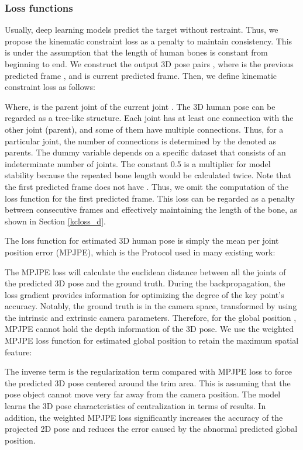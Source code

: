 \documentclass[runningheads]{llncs}
\begin{document}
\subsubsection{Loss functions} Usually, deep learning models predict the target without restraint. Thus, we propose the kinematic constraint loss as a penalty to maintain consistency. This is under the assumption that the length of human bones is constant from beginning to end. We construct the output 3D pose pairs , where  is the previous predicted frame , and  is current predicted frame. Then, we define kinematic constraint loss as follows:

Where,  is the parent joint of the current joint . The 3D human pose can be regarded as a tree-like structure. Each joint has at least one connection with the other joint (parent), and some of them have multiple connections. Thus, for a particular joint, the number of connections is determined by the  denoted as parents. The dummy variable  depends on a specific dataset that consists of an indeterminate number of joints. The constant 0.5 is a multiplier for model stability because the repeated bone length would be calculated twice. Note that the first predicted frame does not have . Thus, we omit the computation of the loss function for the first predicted frame. This loss can be regarded as a penalty between consecutive frames and effectively maintaining the length of the bone, as shown in Section \ref{kcloss_d}.

The loss function for estimated 3D human pose is simply the mean per joint position error (MPJPE), which is the Protocol  used in many existing work: 

The MPJPE loss will calculate the euclidean distance between all the joints of the predicted 3D pose and the ground truth. During the backpropagation, the loss gradient provides information for optimizing the degree of the key point's accuracy. Notably, the ground truth is in the camera space, transformed by using the intrinsic and extrinsic camera parameters. Therefore, for the global position , MPJPE cannot hold the depth information of the 3D pose. We use the weighted MPJPE loss function for estimated global position to retain the maximum spatial feature: 

The inverse term  is the regularization term compared with MPJPE loss to force the predicted 3D pose centered around the trim area. This is assuming that the pose object cannot move very far away from the camera position. The model learns the 3D pose characteristics of centralization in terms of results. In addition, the weighted MPJPE loss significantly increases the accuracy of the projected 2D pose and reduces the error caused by the abnormal predicted global position. 
\end{document}
